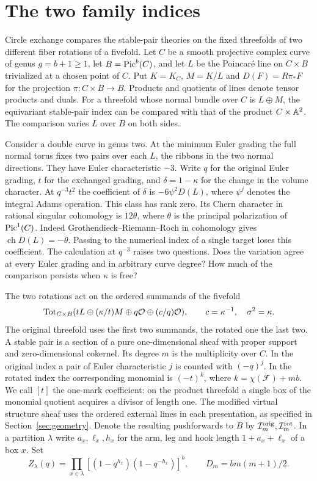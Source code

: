 \section{The two family indices}
Circle exchange compares the stable-pair theories on the fixed threefolds of two different fiber rotations of a fivefold. Let $C$ be a smooth projective complex curve of genus $g=b+1\ge1$,
let $B=\operatorname{Pic}^b(C)$, and let $L$ be the Poincar\'e line on $C\times B$
trivialized at a chosen point of $C$. Put $K=K_C$, $M=K/L$ and
$D(F)=R\pi_*F$ for the projection $\pi:C\times B\to B$. Products
and quotients of lines denote tensor products and duals. For a
threefold whose normal bundle over $C$ is $L\oplus M$, the equivariant
stable-pair index can be compared with that of the product
$C\times\mathbb A^2$. The comparison varies $L$ over $B$ on both sides.

Consider a double curve in genus two. At the minimum Euler grading
the full normal torus fixes two pairs over each $L$, the ribbons in
the two normal directions. They have Euler characteristic $-3$. Write $q$ for the original Euler grading, $t$
for the exchanged grading, and $\delta=1-\kappa$ for the change in
the volume character. At $q^{-3}t^2$ the coefficient of $\delta$ is
$-6\psi^2 D(L)$, where $\psi^j$ denotes the integral Adams operation.
This class has rank zero. Its Chern character in rational singular
cohomology is $12\theta$, where $\theta$ is the principal polarization
of $\operatorname{Pic}^1(C)$. Indeed Grothendieck--Riemann--Roch in cohomology gives
$\operatorname{ch}D(L)=-\theta$.
Passing to the numerical index of a single target loses this coefficient.
The calculation at $q^{-3}$ raises two questions. Does the variation
agree at every Euler grading and in arbitrary curve degree? How much
of the comparison persists when $\kappa$ is free?

The two rotations act on the ordered summands of the fivefold
\[
 \operatorname{Tot}_{C\times B}
 (tL\oplus(\kappa/t)M\oplus q\mathcal O\oplus(c/q)\mathcal O),\qquad
 c=\kappa^{-1},\quad \sigma^2=\kappa .
\]
The original threefold uses the first two summands, the rotated one
the last two. A stable pair is a section of a pure one-dimensional
sheaf with proper support and zero-dimensional cokernel. Its degree
$m$ is the multiplicity over $C$. In the original index a pair of
Euler characteristic $j$ is counted with $(-q)^j$. In the rotated
index the corresponding monomial is $(-t)^k$, where
$k=\chi(\mathcal F)+mb$. We call $[t]$ the one-mark coefficient: on the product threefold a single box of the monomial quotient acquires a divisor of length one. The modified virtual structure sheaf uses
the ordered external lines in each presentation, as specified in
Section~\ref{sec:geometry}. Denote the resulting pushforwards to $B$
by $\mathcal I_m^{\mathrm{orig}},\mathcal I_m^{\mathrm{rot}}$. In a partition $\lambda$ write $a_x,\ell_x,h_x$
for the arm, leg and hook length $1+a_x+\ell_x$ of a box $x$. Set
\[
 Z_\lambda(q)=\prod_{x\in\lambda}[(1-q^{h_x})(1-q^{-h_x})]^b,\qquad
 D_m=bm(m+1)/2.
\]

